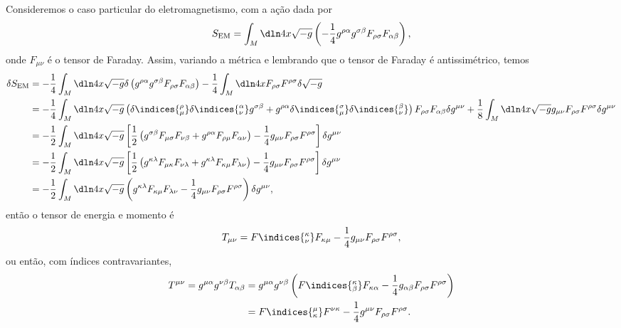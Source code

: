 Consideremos o caso particular do eletromagnetismo, com a ação dada por
\begin{equation*}
    S_\mathrm{EM} = \int_M\dln4x \sqrt{-g}\left(-\frac14 g^{\rho \alpha}g^{\sigma \beta}F_{\rho\sigma}F_{\alpha \beta}\right),
\end{equation*}
onde \(F_{\mu\nu}\) é o tensor de Faraday. Assim, variando a métrica e lembrando que o tensor de Faraday é antissimétrico, temos
\begin{align*}
    \delta S_\mathrm{EM} &= -\frac14\int_{M} \dln4x \sqrt{-g}\delta\left(g^{\rho \alpha}g^{\sigma \beta}F_{\rho\sigma}F_{\alpha\beta}\right) - \frac14 \int_{M} \dln4x F_{\rho\sigma}F^{\rho\sigma} \delta \sqrt{-g}\\
                         &= - \frac14 \int_{M} \dln4x \sqrt{-g} \left(\delta\indices{^\rho_\mu}\delta\indices{^\alpha_\nu} g^{\sigma\beta} + g^{\rho\alpha}\delta\indices{^\sigma_\mu}\delta\indices{^\beta_\nu}\right)F_{\rho\sigma}F_{\alpha\beta}\delta g^{\mu\nu} + \frac18\int_{M} \dln4x \sqrt{-g}g_{\mu\nu}F_{\rho\sigma}F^{\rho\sigma}\delta g^{\mu\nu}\\
                         &= - \frac12 \int_{M} \dln4x \sqrt{-g} \left[\frac12 \left(g^{\sigma\beta}F_{\mu\sigma}F_{\nu\beta} + g^{\rho\alpha}F_{\rho\mu}F_{\alpha\nu}\right) - \frac14 g_{\mu\nu}F_{\rho\sigma}F^{\rho\sigma}\right]\delta g^{\mu\nu}\\
                         &= - \frac12 \int_{M} \dln4x \sqrt{-g} \left[\frac12 \left( g^{\kappa\lambda}F_{\mu\kappa}F_{\nu\lambda} + g^{\kappa\lambda}F_{\kappa\mu}F_{\lambda\nu}\right) - \frac14 g_{\mu\nu}F_{\rho\sigma}F^{\rho\sigma}\right]\delta g^{\mu\nu}\\
                         &= - \frac12 \int_{M} \dln4x \sqrt{-g} \left(g^{\kappa\lambda}F_{\kappa\mu}F_{\lambda\nu} - \frac14 g_{\mu\nu}F_{\rho\sigma}F^{\rho\sigma}\right)\delta g^{\mu\nu},
\end{align*}
então o tensor de energia e momento é
\begin{equation*}
    T_{\mu\nu} = F\indices{^\kappa_\nu}F_{\kappa\mu} - \frac14 g_{\mu\nu} F_{\rho\sigma}F^{\rho\sigma},
\end{equation*}
ou então, com índices contravariantes,
\begin{align*}
    T^{\mu\nu} = g^{\mu\alpha}g^{\nu\beta}T_{\alpha\beta} &= g^{\mu\alpha}g^{\nu\beta} \left(F\indices{^\kappa_\beta}F_{\kappa\alpha} - \frac14 g_{\alpha\beta} F_{\rho\sigma}F^{\rho\sigma}\right)\\
                                                          &= F\indices{^\mu_\kappa}F^{\nu\kappa} - \frac14g^{\mu\nu}F_{\rho\sigma}F^{\rho\sigma}.
\end{align*}

